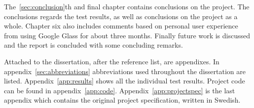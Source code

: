 The~\ref{sec:conclusion}th and final chapter contains conclusions on the project. The conclusions regards the test results, as well as conclusions on the project as a whole. Chapter six also includes comments based on personal user experience from using Google Glass for about three months. Finally future work is discussed and the report is concluded with some concluding remarks.

Attached to the dissertation, after the reference list, are appendixes. In appendix~\ref{sec:abbreviations} abbreviations used throughout the dissertation are listed. Appendix~\ref{app:results} shows all the individual test results. Project code can be found in appendix~\ref{app:code}. Appendix~\ref{app:projectspec} is the last appendix which contains the original project specification, written in Swedish.